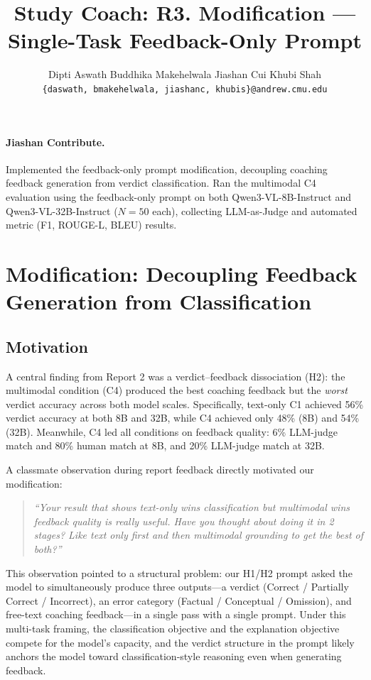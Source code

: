\documentclass{article}
\title{Study Coach: R3. Modification --- Single-Task Feedback-Only Prompt}
\author{
  Dipti Aswath \hspace{2em} Buddhika Makehelwala \hspace{2em} Jiashan Cui \hspace{2em} Khubi Shah \\
  \texttt{\{daswath, bmakehelwala, jiashanc, khubis\}@andrew.cmu.edu}
  }
\date{}
\begin{document}
\maketitle

\paragraph{Jiashan Contribute.}
Implemented the feedback-only prompt modification, decoupling coaching feedback generation from verdict classification. Ran the multimodal C4 evaluation using the feedback-only prompt on both Qwen3-VL-8B-Instruct and Qwen3-VL-32B-Instruct ($N{=}50$ each), collecting LLM-as-Judge and automated metric (F1, ROUGE-L, BLEU) results.

\section{Modification: Decoupling Feedback Generation from Classification}

\subsection{Motivation}

A central finding from Report 2 was a verdict--feedback dissociation (H2): the multimodal condition (C4)
produced the best coaching feedback but the \emph{worst} verdict accuracy across both model scales.
Specifically, text-only C1 achieved 56\% verdict accuracy at both 8B and 32B, while C4 achieved only
48\% (8B) and 54\% (32B). Meanwhile, C4 led all conditions on feedback quality: 6\% LLM-judge match and
80\% human match at 8B, and 20\% LLM-judge match at 32B.

A classmate observation during report feedback directly motivated our modification:
\begin{quote}
\emph{``Your result that shows text-only wins classification but multimodal wins feedback quality is
really useful. Have you thought about doing it in 2 stages? Like text only first and then multimodal
grounding to get the best of both?''}
\end{quote}

This observation pointed to a structural problem: our H1/H2 prompt asked the model to simultaneously
produce three outputs---a verdict (Correct / Partially Correct / Incorrect), an error category
(Factual / Conceptual / Omission), and free-text coaching feedback---in a single pass with a single
prompt. Under this multi-task framing, the classification objective and the explanation objective
compete for the model's capacity, and the verdict structure in the prompt likely anchors the model
toward classification-style reasoning even when generating feedback.
\end{document}
